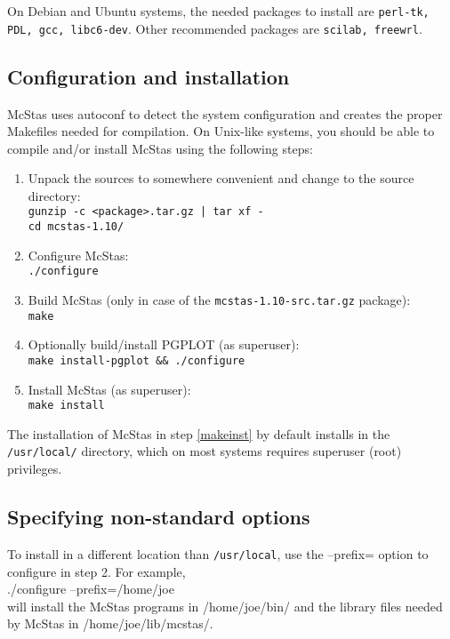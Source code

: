 \noindent On Debian and Ubuntu systems, the
needed packages to install are \texttt{perl-tk, PDL, gcc,
  libc6-dev}. Other recommended packages are \texttt{scilab, freewrl}.

\subsection{Configuration and installation}
McStas uses autoconf to detect the system configuration and creates the
proper Makefiles needed for compilation. On Unix-like systems, you
should be able to compile and/or install McStas using the following steps:
\begin{enumerate}
\item{Unpack the sources to somewhere convenient and change to the
    source directory:\\
  \texttt{gunzip -c <package>.tar.gz | tar xf -}\\
  \texttt{cd mcstas-1.10/}}
\item{Configure McStas:\\
  \texttt{./configure}}
\item{Build McStas (only in case of the \verb+mcstas-1.10-src.tar.gz+ package):\\
  \texttt{make}}
\item{Optionally build/install PGPLOT (as superuser):\\
    \texttt{make install-pgplot \&\& ./configure}
    \label{pg_install}}
\item{Install McStas (as superuser):\\
  \texttt{make install}
\label{makeinst}}
\end{enumerate}



\noindent The installation of McStas in step \ref{makeinst} by default installs in the
\texttt{/usr/local/} directory, which on most systems requires superuser (root)
privileges. 

\subsection{Specifying non-standard options}
To install in a different location than \texttt{/usr/local}, use the --prefix= option to
configure in step 2. For example,\\

  ./configure --prefix=/home/joe\\

\noindent will install the McStas programs in /home/joe/bin/ and the
library files needed by McStas in /home/joe/lib/mcstas/.

